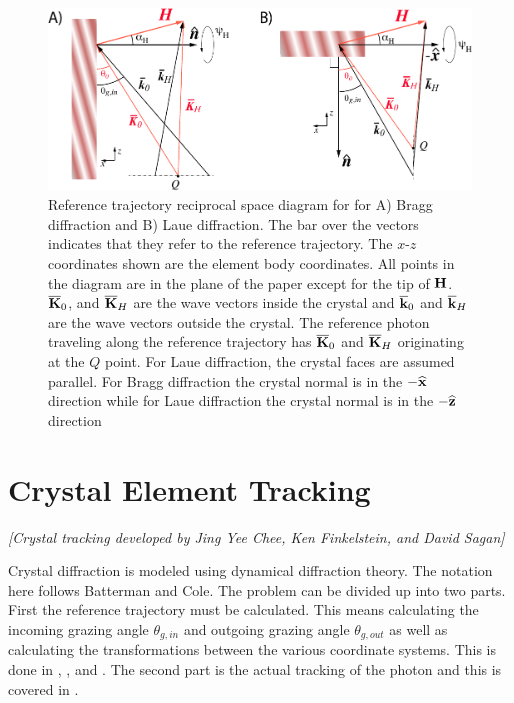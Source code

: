 \begin{figure}[tb]
  \centering
  \includegraphics[width=5in]{crystal-diffraction.pdf}
  \caption[Reference trajectory reciprocal space diagram for crystal diffraction.]
{Reference trajectory reciprocal space diagram for for A) Bragg
diffraction and B) Laue diffraction. The bar over the vectors
indicates that they refer to the reference trajectory. The $x$-$z$
coordinates shown are the element body coordinates. All points in the
diagram are in the plane of the paper except for the tip of ${\bf H}$.
$\overline{{\bf K}}_{0}$, and $\overline{{\bf K}}_{H}$ are the wave vectors inside the
crystal and $\overline{{\bf k}}_{0}$ and $\overline{{\bf k}}_{H}$ are the wave vectors
outside the crystal. The reference photon traveling along the
reference trajectory has $\overline{{\bf K}}_0$ and $\overline{{\bf K}}_H$ originating at
the $Q$ point. For Laue diffraction, the crystal faces are assumed
parallel.  For Bragg diffraction the crystal normal is in the $-{\widehat{\bf x}}$ direction while for Laue diffraction the crystal normal is in the
$-{\widehat{\bf z}}$ direction
  }
  \label{f:crystal.diffraction}
\end{figure}

\section{Crystal Element Tracking}
\label{s:crystal.tracking}

\textit{\large [Crystal tracking developed by Jing Yee Chee, Ken Finkelstein, and David Sagan]}

Crystal diffraction is modeled using dynamical diffraction theory. The
notation here follows Batterman and Cole\cite{b:batterman}.  The
problem can be divided up into two parts. First the reference
trajectory must be calculated. This means calculating the incoming
grazing angle $\theta_{g,in}$ and outgoing grazing angle
$\theta_{g,out}$ as well as calculating the transformations between
the various coordinate systems. This is done in ,
, and .  The second part
is the actual tracking of the photon and this is covered in
.

